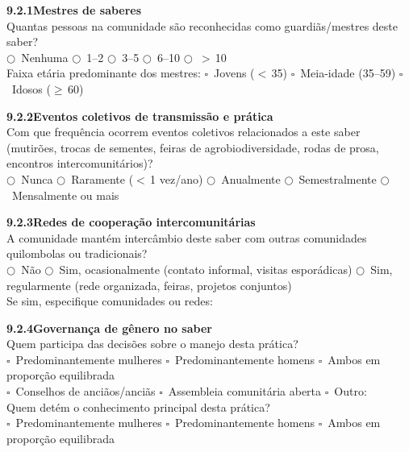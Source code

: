 \noindent\textbf{9.2.1\quad Mestres de saberes}\\[2pt]
Quantas pessoas na comunidade são reconhecidas como guardiãs/mestres deste saber?\\
$\bigcirc$~Nenhuma \quad $\bigcirc$~1--2 \quad $\bigcirc$~3--5 \quad $\bigcirc$~6--10 \quad $\bigcirc$~$>$\,10\\[2pt]
Faixa etária predominante dos mestres: $\square$~Jovens ($<$\,35) \quad $\square$~Meia-idade (35--59) \quad $\square$~Idosos ($\geq$\,60)

\medskip\noindent\textbf{9.2.2\quad Eventos coletivos de transmissão e prática}\\[2pt]
Com que frequência ocorrem eventos coletivos relacionados a este saber (mutirões, trocas de sementes, feiras de agrobiodiversidade, rodas de prosa, encontros intercomunitários)?\\
$\bigcirc$~Nunca \quad $\bigcirc$~Raramente ($<$\,1 vez/ano) \quad $\bigcirc$~Anualmente \quad $\bigcirc$~Semestralmente \quad $\bigcirc$~Mensalmente ou mais

\medskip\noindent\textbf{9.2.3\quad Redes de cooperação intercomunitárias}\\[2pt]
A comunidade mantém intercâmbio deste saber com outras comunidades quilombolas ou tradicionais?\\
$\bigcirc$~Não \quad $\bigcirc$~Sim, ocasionalmente (contato informal, visitas esporádicas) \quad $\bigcirc$~Sim, regularmente (rede organizada, feiras, projetos conjuntos)\\[2pt]
Se sim, especifique comunidades ou redes: \dotfill

\medskip\noindent\textbf{9.2.4\quad Governança de gênero no saber}\\[2pt]
Quem participa das decisões sobre o manejo desta prática?\\
$\square$~Predominantemente mulheres \quad $\square$~Predominantemente homens \quad $\square$~Ambos em proporção equilibrada\\
$\square$~Conselhos de anciãos/anciãs \quad $\square$~Assembleia comunitária aberta \quad $\square$~Outro: \dotfill\\[4pt]
Quem detém o conhecimento principal desta prática?\\
$\square$~Predominantemente mulheres \quad $\square$~Predominantemente homens \quad $\square$~Ambos em proporção equilibrada

